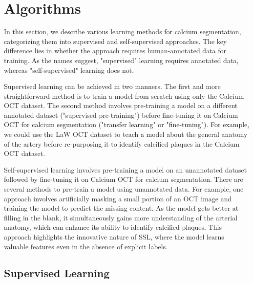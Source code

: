 \documentclass[a4paper,11pt,oneside]{report}
\begin{document}
\newpage
\section{Algorithms}
In this section, we describe various learning methods for calcium segmentation, categorizing them into supervised and self-supervised approaches. The key difference lies in whether the approach requires human-annotated data for training. As the names suggest, "supervised" learning requires annotated data, whereas "self-supervised" learning does not.

Supervised learning can be achieved in two manners. The first and more straightforward method is to train a model from scratch using only the Calcium OCT dataset. The second method involves pre-training a model on a different annotated dataset ("supervised pre-training") before fine-tuning it on Calcium OCT for calcium segmentation ("transfer learning" or "fine-tuning"). For example, we could use the LaW OCT dataset to teach a model about the general anatomy of the artery before re-purposing it to identify calcified plaques in the Calcium OCT dataset. 

Self-supervised learning involves pre-training a model on an unannotated dataset followed by fine-tuning it on Calcium OCT for calcium segmentation. There are several methods to pre-train a model using unannotated data. For example, one approach involves artificially masking a small portion of an OCT image and training the model to predict the missing content. As the model gets better at filling in the blank, it simultaneously gains more understanding of the arterial anatomy, which can enhance its ability to identify calcified plaques. This approach highlights the innovative nature of SSL, where the model learns valuable features even in the absence of explicit labels.


\subsection{Supervised Learning}
\end{document}
